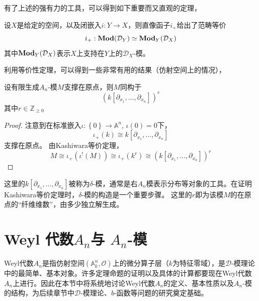 \documentclass[12pt,a4paper]{ctexrep}   %
\begin{document}
有了上述的强有力的工具，可以得到如下重要而又直观的定理，
\begin{theorem}
    \label{thm:Kashiwara等价定理}
    设$X$是给定的空间，以及闭嵌入$i:Y\rightarrow X$，则直像函子$i_+$给出了范畴等价
    \begin{equation*}
        i_+:\mathbf{Mod} (\mathcal{D}_Y)\simeq \mathbf{Mod}_Y(\mathcal{D}_X)
    \end{equation*}
    其中$\mathbf{Mod}_Y(\mathcal{D}_X)$表示$X$上支持在$Y$上的$\mathcal{D}_X$-模。
\end{theorem}
利用等价性定理，可以得到一些非常有用的结果（仿射空间上的情况），
\begin{corollary}
    设有限生成$A_n$-模$M$支撑在原点，则$M$同构于
    \begin{equation*}
        ( k[\partial_{x_1},\ldots,\partial_{x_n}])^r
    \end{equation*}
    其中$r\in \mathbb{Z}_{\geq 0}$
    \begin{proof}
        注意到在标准嵌入$\iota :\left\{0\right\}\rightarrow \mathbb{A}^n$, $\iota(0)=0$下，
        \begin{equation*}
            \iota_+(k) \cong k[\partial_{x_1},\ldots,\partial_{x_n}]
        \end{equation*}
        支撑在原点。
        由Kashiwara等价定理，
        \begin{equation*}
            M\cong \iota_+(\iota^!(M))\cong \iota_+(k^r)\cong ( k[\partial_{x_1},\ldots,\partial_{x_n}])^r
        \end{equation*}
    \end{proof}
\end{corollary}

\begin{remark}
    这里的$k[\partial_{x_1},\ldots,\partial_{x_n}]$被称为$\delta$-模，通常是右$A_n$模表示分布等对象的工具。在证明Kashiwara等价定理时，$\delta$-模的构造是一个重要步骤。
    这里的$r$即为该模$M$的在原点的“纤维维数”，由多少独立解生成。
\end{remark}




\chapter{Weyl 代数$A_n$与 $A_n$-模}
Weyl代数$A_n$是指仿射空间$\left(\mathbb{A}^n_k,\mathcal{O}\right)$上的微分算子层（$k$为特征零域），是$\mathcal{D}$-模理论中的最简单、基本对象。许多定理命题的证明以及具体的计算都要现在Weyl代数$A_n$上进行。因此在本节中将系统地讨论Weyl代数$A_n$的定义、基本性质以及$A_n$-模的结构，为后续章节中$\mathcal{D}$-模理论、$b$-函数等问题的研究奠定基础。
\end{document}
